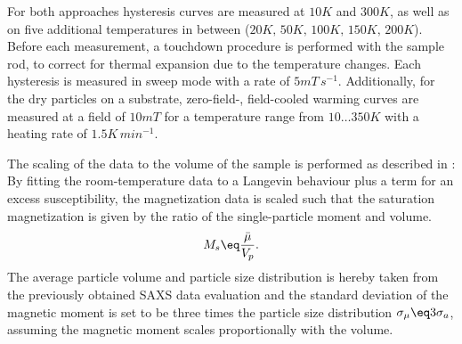 \documentclass[\main/dresen_thesis.tex]{subfiles}
\begin{document}
    For both approaches hysteresis curves are measured at $10 \unit{K}$ and $300 \unit{K}$, as well as on five additional temperatures in between ($20\unit{K},\,50\unit{K},\,100\unit{K},\,150\unit{K},\,200\unit{K}$).
    Before each measurement, a touchdown procedure is performed with the sample rod, to correct for thermal expansion due to the temperature changes.
    Each hysteresis is measured in sweep mode with a rate of $5 \unit{mT \, s^{-1}}$.
    Additionally, for the dry particles on a substrate, zero-field-, field-cooled warming curves are measured at a field of $10 \unit{mT}$ for a temperature range from $10 \ldots 350 \unit{K}$ with a heating rate of $1.5 \unit{K \, min^{-1}}$.

    The scaling of the data to the volume of the sample is performed as described in :
    By fitting the room-temperature data to a Langevin behaviour plus a term for an excess susceptibility, the magnetization data is scaled such that the saturation magnetization is given by the ratio of the single-particle moment and volume.
    \begin{align}
      M_s \eq \frac{\bar{\mu}}{V_p}.
    \end{align}
    The average particle volume and particle size distribution is hereby taken from the previously obtained SAXS data evaluation and the standard deviation of the magnetic moment is set to be three times the particle size distribution $\sigma_\mu \eq 3 \sigma_a$, assuming the magnetic moment scales proportionally with the volume.

\end{document}
